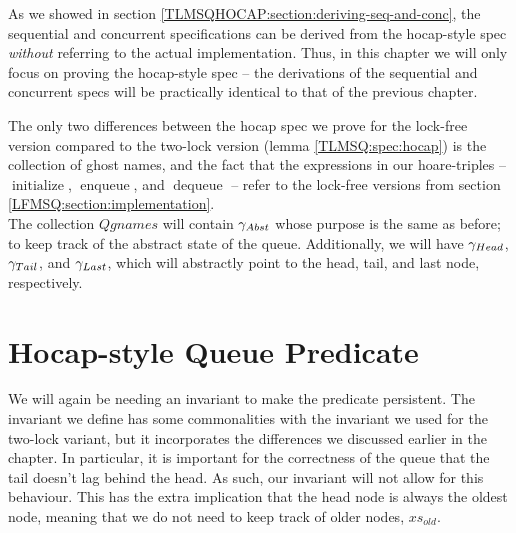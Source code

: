 \documentclass[a4paper, 11pt]{report}
\newcommand{\initialise}{\operatorname{initialize}}
\newcommand{\enqueue}{\operatorname{enqueue}}
\newcommand{\dequeue}{\operatorname{dequeue}}
\begin{document}
As we showed in section \ref{TLMSQHOCAP:section:deriving-seq-and-conc}, the sequential and concurrent specifications can be derived from the hocap-style spec \emph{without} referring to the actual implementation. Thus, in this chapter we will only focus on proving the hocap-style spec -- the derivations of the sequential and concurrent specs will be practically identical to that of the previous chapter.

The only two differences between the hocap spec we prove for the lock-free version compared to the two-lock version (lemma \ref{TLMSQ:spec:hocap}) is the collection of ghost names, and the fact that the expressions in our hoare-triples -- $\initialise$, $\enqueue$, and $\dequeue$ -- refer to the lock-free versions from section \ref{LFMSQ:section:implementation}.\\
The collection $Qgnames$ will contain $\gamma_{Abst}$ whose purpose is the same as before; to keep track of the abstract state of the queue. Additionally, we will have $\gamma_{Head}$, $\gamma_{Tail}$, and $\gamma_{Last}$, which will abstractly point to the head, tail, and last node, respectively. 

\section{Hocap-style Queue Predicate}
\label{LFMSQ:section:hocap-queue-pred}

We will again be needing an invariant to make the predicate persistent. The invariant we define has some commonalities with the invariant we used for the two-lock variant, but it incorporates the differences we discussed earlier in the chapter. In particular, it is important for the correctness of the queue that the tail doesn't lag behind the head. As such, our invariant will not allow for this behaviour. This has the extra implication that the head node is always the oldest node, meaning that we do not need to keep track of older nodes, $xs_{old}$.
\end{document}

